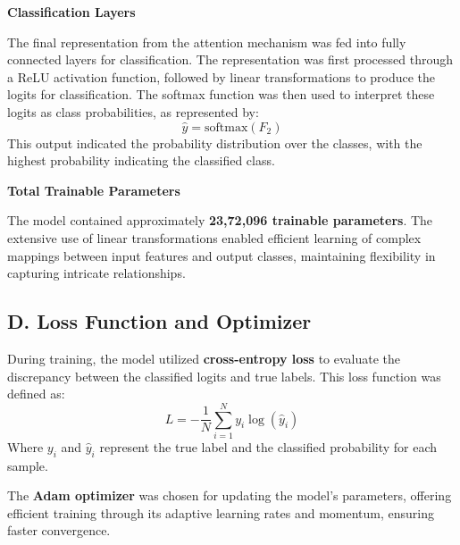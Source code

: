 \documentclass[conference]{IEEEtran}
\begin{document}
\vspace{0.15cm} 
\textbf{Classification Layers}

The final representation from the attention mechanism was fed into fully connected layers for classification. The representation was first processed through a ReLU activation function, followed by linear transformations to produce the logits for classification. The softmax function was then used to interpret these logits as class probabilities, as represented by:
\begin{equation}
\hat{y} = \text{softmax}(F_2)
\end{equation}
This output indicated the probability distribution over the classes, with the highest probability indicating the classified class.

\vspace{0.15cm} 
\textbf{Total Trainable Parameters}

The model contained approximately \textbf{23,72,096 trainable parameters}. The extensive use of linear transformations enabled efficient learning of complex mappings between input features and output classes, maintaining flexibility in capturing intricate relationships.

\subsection*{D. Loss Function and Optimizer}
During training, the model utilized \textbf{cross-entropy loss} to evaluate the discrepancy between the classified logits and true labels. This loss function was defined as:
\begin{equation}
L = - \frac{1}{N} \sum_{i=1}^{N} y_i \log(\hat{y}_i)
\end{equation}
Where \(y_i\) and \(\hat{y}_i\) represent the true label and the classified probability for each sample.

The \textbf{Adam optimizer} was chosen for updating the model’s parameters, offering efficient training through its adaptive learning rates and momentum, ensuring faster convergence.
\end{document}
